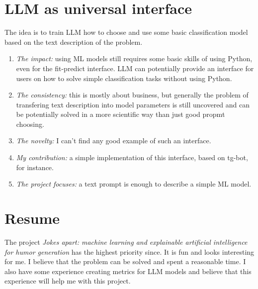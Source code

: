 \documentclass[12pt]{article}
\begin{document}
\section{LLM as universal interface}
The idea is to train LLM how to choose and use some basic classification model based on the text description of the problem.
\begin{enumerate}
\item \emph{The impact:} using ML models still requires some basic skills of using Python, even for the fit-predict interface. LLM can potentially provide an interface for users on how to solve simple classification tasks without using Python.
\item \emph{The consistency:} this is mostly about business, but generally the problem of transfering text description into model parameters is still uncovered and can be potentially solved in a more scientific way than just good propmt choosing.
\item \emph{The novelty:} I can't find any good example of such an interface.
\item \emph{My contribution:} a simple implementation of this interface, based on tg-bot, for instance.
\item \emph{The project focuses:} a text prompt is enough to describe a simple ML model.
\end{enumerate}

\section{Resume}
The project \emph{Jokes apart: machine learning and explainable artificial intelligence for humor generation} has the highest priority since. It is fun and looks interesting for me. I believe that the problem can be solved and spent a reasonable time. I also have some experience creating metrics for LLM models and believe that this experience will help me with this project.
\end{document}
